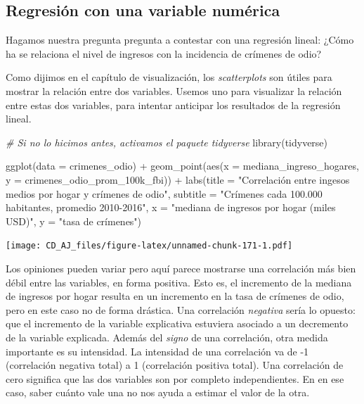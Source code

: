 \documentclass[
]{book}
\newenvironment{Shaded}{\begin{snugshade}}{\end{snugshade}}
\newcommand{\AttributeTok}[1]{\textcolor[rgb]{0.77,0.63,0.00}{#1}}
\newcommand{\CommentTok}[1]{\textcolor[rgb]{0.56,0.35,0.01}{\textit{#1}}}
\newcommand{\FunctionTok}[1]{\textcolor[rgb]{0.00,0.00,0.00}{#1}}
\newcommand{\NormalTok}[1]{#1}
\newcommand{\SpecialCharTok}[1]{\textcolor[rgb]{0.00,0.00,0.00}{#1}}
\newcommand{\StringTok}[1]{\textcolor[rgb]{0.31,0.60,0.02}{#1}}
\begin{document}
\hypertarget{regresiuxf3n-con-una-variable-numuxe9rica}{%
\subsection{Regresión con una variable numérica}\label{regresiuxf3n-con-una-variable-numuxe9rica}}

Hagamos nuestra pregunta pregunta a contestar con una regresión lineal: ¿Cómo ha se relaciona el nivel de ingresos con la incidencia de crímenes de odio?

Como dijimos en el capítulo de visualización, los \emph{scatterplots} son útiles para mostrar la relación entre dos variables. Usemos uno para visualizar la relación entre estas dos variables, para intentar anticipar los resultados de la regresión lineal.

\begin{Shaded}
\begin{Highlighting}[]
\CommentTok{\# Si no lo hicimos antes, activamos el paquete tidyverse}
\FunctionTok{library}\NormalTok{(tidyverse)}
\end{Highlighting}
\end{Shaded}

\begin{Shaded}
\begin{Highlighting}[]
\FunctionTok{ggplot}\NormalTok{(}\AttributeTok{data =}\NormalTok{ crimenes\_odio) }\SpecialCharTok{+} 
    \FunctionTok{geom\_point}\NormalTok{(}\FunctionTok{aes}\NormalTok{(}\AttributeTok{x =}\NormalTok{ mediana\_ingreso\_hogares, }\AttributeTok{y =}\NormalTok{ crimenes\_odio\_prom\_100k\_fbi)) }\SpecialCharTok{+}
    \FunctionTok{labs}\NormalTok{(}\AttributeTok{title =} \StringTok{"Correlación entre ingesos medios por hogar y crímenes de odio"}\NormalTok{,}
         \AttributeTok{subtitle =} \StringTok{"Crímenes cada 100.000 habitantes, promedio 2010{-}2016"}\NormalTok{,}
         \AttributeTok{x =} \StringTok{"mediana de ingresos por hogar (miles USD)"}\NormalTok{,}
         \AttributeTok{y =} \StringTok{"tasa de crímenes"}\NormalTok{)}
\end{Highlighting}
\end{Shaded}

\texttt{[image: CD\_AJ\_files/figure-latex/unnamed-chunk-171-1.pdf]}

Los opiniones pueden variar pero aquí parece mostrarse una correlación más bien débil entre las variables, en forma positiva. Esto es, el incremento de la mediana de ingresos por hogar resulta en un incremento en la tasa de crímenes de odio, pero en este caso no de forma drástica. Una correlación \emph{negativa} sería lo opuesto: que el incremento de la variable explicativa estuviera asociado a un decremento de la variable explicada. Además del \emph{signo} de una correlación, otra medida importante es su intensidad. La intensidad de una correlación va de -1 (correlación negativa total) a 1 (correlación positiva total). Una correlación de cero significa que las dos variables son por completo independientes. En en ese caso, saber cuánto vale una no nos ayuda a estimar el valor de la otra.
\end{document}
